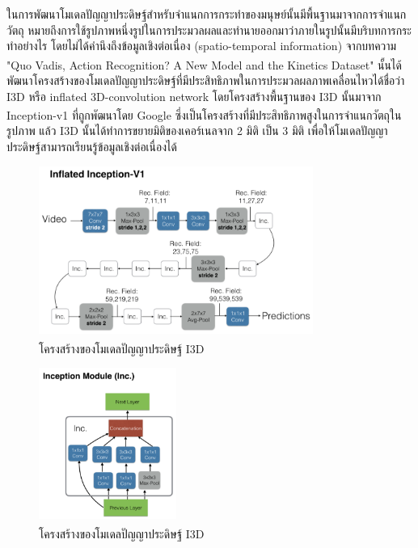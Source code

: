 ในการพัฒนาโมเดลปัญญาประดิษฐ์สำหรับจำแนกการกระทำของมนุษย์นั้นมีพื้นฐานมาจากการจำแนกวัตถุ หมายถึงการใช้รูปภาพหนึ่งรูปในการประมวลผลและทำนายออกมาว่าภายในรูปนั้นมีบริบทการกระทำอย่างไร 
โดยไม่ได้คำนึงถึงข้อมูลเชิงต่อเนื่อง (spatio-temporal information) จากบทความ "Quo Vadis, Action Recognition? A New Model and the Kinetics Dataset"\textsuperscript{\cite{I3D}} 
นั้นได้พัฒนาโครงสร้างของโมเดลปัญญาประดิษฐ์ที่มีประสิทธิภาพในการประมวลผลภาพเคลื่อนไหวได้ชื่อว่า I3D หรือ inflated 3D-convolution network
โดยโครงสร้างพื้นฐานของ I3D นั้นมาจาก Inception-v1\textsuperscript{\cite{Inception}} ที่ถูกพัฒนาโดย Google ซึ่งเป็นโครงสร้างที่มีประสิทธิภาพสูงในการจำแนกวัตถุในรูปภาพ
แล้ว I3D นั้นได้ทำการขยายมิติของเคอร์เนลจาก 2 มิติ เป็น 3 มิติ เพื่อให้โมเดลปัญญาประดิษฐ์สามารถเรียนรู้ข้อมูลเชิงต่อเนื่องได้
\begin{figure}[!ht]
    \centering
    \includegraphics[width=0.8\textwidth]{chapter2/images/I3D.png}
    \caption{โครงสร้างของโมเดลปัญญาประดิษฐ์ I3D\textsuperscript{\cite{I3D}}}
    \label{fig:I3DArch}
\end{figure}
\begin{figure}[!ht]
    \centering
    \includegraphics[width=0.4\textwidth]{chapter2/images/inceptionModule.png}
    \caption{โครงสร้างของโมเดลปัญญาประดิษฐ์ I3D\textsuperscript{\cite{I3D}}}
    \label{fig:InceptionModule}
\end{figure}
